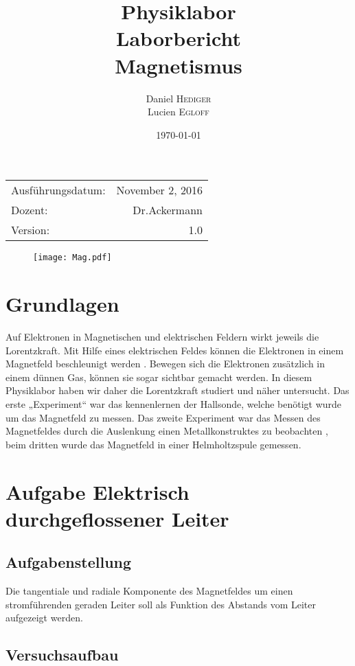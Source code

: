 \documentclass{article}
\title{Physiklabor \\ Laborbericht \\ Magnetismus} %
\author{Daniel \textsc{Hediger} \\ Lucien \textsc{Egloff}} %
\date{\today} %
\begin{document}
\maketitle %

\begin{center}
\begin{tabular}{l r}
Ausführungsdatum: & November 2, 2016 \\ %
Dozent: & Dr.Ackermann \\%
Version: & 1.0

\end{tabular}
\end{center}
\begin{figure}[H]
	\centering
	\texttt{[image: Mag.pdf]} 
\end{figure}
\newpage
\tableofcontents 

\newpage
\section{Grundlagen}
Auf Elektronen in Magnetischen und elektrischen Feldern wirkt jeweils die Lorentzkraft. Mit Hilfe eines elektrischen Feldes können die Elektronen in einem Magnetfeld beschleunigt werden
. Bewegen sich die Elektronen zusätzlich in einem dünnen Gas, können sie sogar sichtbar gemacht werden.
In diesem Physiklabor haben wir daher die Lorentzkraft studiert und näher untersucht.  Das erste „Experiment“ war das kennenlernen der Hallsonde, welche benötigt wurde um das Magnetfeld zu messen.
Das zweite Experiment war das Messen des Magnetfeldes durch die Auslenkung einen Metallkonstruktes zu beobachten , beim dritten 
wurde das Magnetfeld in einer Helmholtzspule gemessen.
\section{Aufgabe Elektrisch durchgeflossener Leiter}
\subsection{Aufgabenstellung}
Die tangentiale und radiale Komponente des Magnetfeldes um einen stromführenden
geraden Leiter soll als Funktion des Abstands vom Leiter aufgezeigt werden.
\subsection{Versuchsaufbau}
\end{document}

